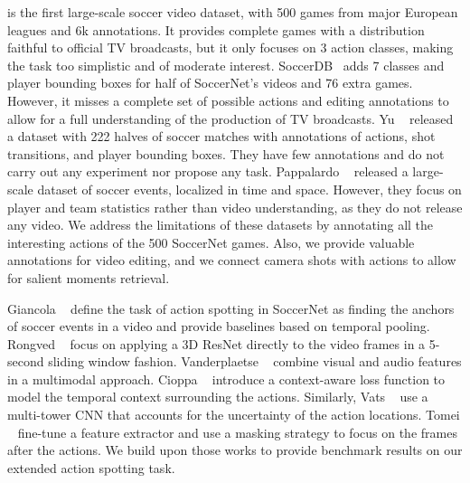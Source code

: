 \documentclass[final]{cvsports}
\begin{document}
\SoccerNet is the first large-scale soccer video dataset, with 500 games from major European leagues and 6k annotations. It provides complete games with a distribution faithful to official TV broadcasts, but it only focuses on 3 action classes, making the task too simplistic and of moderate interest.
SoccerDB~\cite{Jiang2020SoccerDB} adds 7 classes and player bounding boxes for half of SoccerNet's videos and 76 extra games. However, it misses a complete set of possible actions and editing annotations to allow for a full understanding of the production of TV broadcasts. 
Yu \etal~\cite{Yu2018Comprehensive} released a dataset with 222 halves of soccer matches with annotations of actions, shot transitions, and player bounding boxes. They have few annotations and do not carry out any experiment nor propose any task. 
Pappalardo \etal~\cite{Pappalardo2019Apublic} released a large-scale dataset of soccer events, localized in time and space. However, they focus on player and team statistics rather than video understanding, as they do not release any video. 
We address the limitations of these datasets by annotating all the interesting actions of the 500 SoccerNet games. Also, we provide valuable annotations for video editing, and we connect camera shots with actions to allow for salient moments retrieval. 






 Giancola \etal~\cite{Giancola_2018_CVPR_Workshops} define the task of action spotting in SoccerNet as finding the anchors of soccer events in a video and provide baselines based on temporal pooling. Rongved \etal~\cite{rongved-ism2020} focus on applying a 3D ResNet directly to the video frames in a 5-second sliding window fashion. Vanderplaetse \etal~\cite{Vanderplaetse2020Improved} combine visual and audio features in a multimodal approach. Cioppa \etal~\cite{cioppa2020context} introduce a context-aware loss function to model the temporal context surrounding the actions. Similarly, Vats \etal~\cite{vats2020event} use a multi-tower CNN that accounts for the uncertainty of the action locations. Tomei \etal~\cite{tomei2020RMS} fine-tune a feature extractor and use a masking strategy to focus on the frames after the actions. 
We build upon those works to provide benchmark results on our extended action spotting task.
\end{document}
